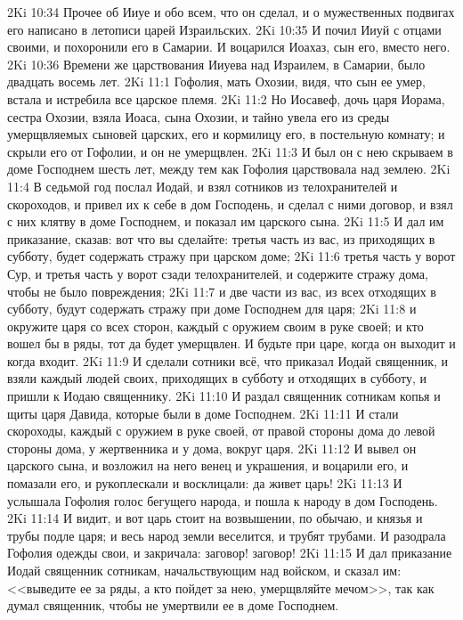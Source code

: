 \rsbpar\vs 2Ki 10:34 Прочее об Ииуе и обо всем, что он сделал, и о мужественных подвигах его написано в летописи царей Израильских.
\vs 2Ki 10:35 И почил Ииуй с отцами своими, и похоронили его в Самарии. И воцарился Иоахаз, сын его, вместо него.
\vs 2Ki 10:36 Времени же царствования Ииуева над Израилем, в Самарии, было двадцать восемь лет.
\vs 2Ki 11:1 Гофолия, мать Охозии, видя, что сын ее умер, встала и истребила все царское племя.
\vs 2Ki 11:2 Но Иосавеф, дочь царя Иорама, сестра Охозии, взяла Иоаса, сына Охозии, и тайно увела его из среды умерщвляемых сыновей царских, его и кормилицу его, в постельную комнату; и скрыли его от Гофолии, и он не умерщвлен.
\vs 2Ki 11:3 И был он с нею скрываем в доме Господнем шесть лет, между тем как Гофолия царствовала над землею.
\rsbpar\vs 2Ki 11:4 В седьмой год послал Иодай, и взял сотников из телохранителей и скороходов, и привел их к себе в дом Господень, и сделал с ними договор, и взял с них клятву в доме Господнем, и показал им царского сына.
\vs 2Ki 11:5 И дал им приказание, сказав: вот что вы сделайте: третья часть из вас, из приходящих в субботу, будет содержать стражу при царском доме;
\vs 2Ki 11:6 третья часть у ворот Сур, и третья часть у ворот сзади телохранителей, и содержите стражу дома, чтобы не было повреждения;
\vs 2Ki 11:7 и две части из вас, из всех отходящих в субботу, будут содержать стражу при доме Господнем для царя;
\vs 2Ki 11:8 и окружите царя со всех сторон, каждый с оружием своим в руке своей; и кто вошел бы в ряды, тот да будет умерщвлен. И будьте при царе, когда он выходит и когда входит.
\vs 2Ki 11:9 И сделали сотники всё, что приказал Иодай священник, и взяли каждый людей своих, приходящих в субботу и отходящих в субботу, и пришли к Иодаю священнику.
\vs 2Ki 11:10 И раздал священник сотникам копья и щиты царя Давида, которые были в доме Господнем.
\vs 2Ki 11:11 И стали скороходы, каждый с оружием в руке своей, от правой стороны дома до левой стороны дома, у жертвенника и у дома, вокруг царя.
\vs 2Ki 11:12 И вывел он царского сына, и возложил на него  венец и украшения, и воцарили его, и помазали его, и рукоплескали и восклицали: да живет царь!
\vs 2Ki 11:13 И услышала Гофолия голос бегущего народа, и пошла к народу в дом Господень.
\vs 2Ki 11:14 И видит, и вот царь стоит на возвышении, по обычаю, и князья и трубы подле царя; и весь народ земли веселится, и трубят трубами. И разодрала Гофолия одежды свои, и закричала: заговор! заговор!
\vs 2Ki 11:15 И дал приказание Иодай священник сотникам, начальствующим над войском, и сказал им: <<выведите ее за ряды, а кто пойдет за нею, умерщвляйте мечом>>, так как думал священник, чтобы не умертвили ее в доме Господнем.
